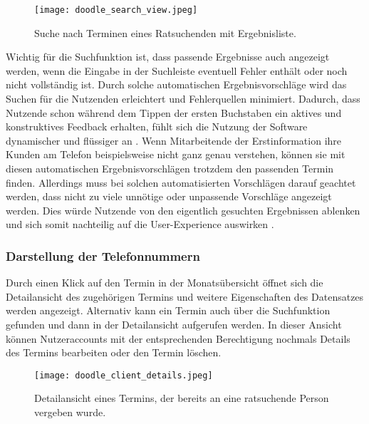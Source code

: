 \begin{figure}[H]
    \caption{Suche nach Terminen eines Ratsuchenden mit Ergebnisliste.}
    \centering
    \texttt{[image: doodle\_search\_view.jpeg]}
\end{figure}

Wichtig für die Suchfunktion ist, dass passende Ergebnisse auch angezeigt
werden, wenn die Eingabe in der Suchleiste eventuell Fehler enthält oder noch
nicht vollständig ist. Durch solche automatischen Ergebnisvorschläge wird das
Suchen für die Nutzenden erleichtert und Fehlerquellen minimiert. Dadurch, dass
Nutzende schon während dem Tippen der ersten Buchstaben ein aktives und
konstruktives Feedback erhalten, fühlt sich die Nutzung der Software
dynamischer und flüssiger an \cite{autoCompletion}. Wenn Mitarbeitende der
Erstinformation ihre Kunden am Telefon beispielsweise nicht ganz genau
verstehen, können sie mit diesen automatischen Ergebnisvorschlägen trotzdem den
passenden Termin finden. Allerdings muss bei solchen automatisierten
Vorschlägen darauf geachtet werden, dass nicht zu viele unnötige oder
unpassende Vorschläge angezeigt werden. Dies würde Nutzende von den eigentlich
gesuchten Ergebnissen ablenken und sich somit nachteilig auf die
User-Experience auswirken \cite{autosuggModeration}.

\subsubsection{Darstellung der Telefonnummern}

Durch einen Klick auf den Termin in der Monatsübersicht öffnet sich die
Detailansicht des zugehörigen Termins und weitere Eigenschaften des Datensatzes
werden angezeigt. Alternativ kann ein Termin auch über die Suchfunktion
gefunden und dann in der Detailansicht aufgerufen werden. In dieser Ansicht
können Nutzeraccounts mit der entsprechenden Berechtigung nochmals Details des
Termins bearbeiten oder den Termin löschen.

\begin{figure}[H]
    \caption{Detailansicht eines Termins, der bereits an eine ratsuchende Person vergeben wurde.}
    \centering
    \texttt{[image: doodle\_client\_details.jpeg]}
\end{figure}

